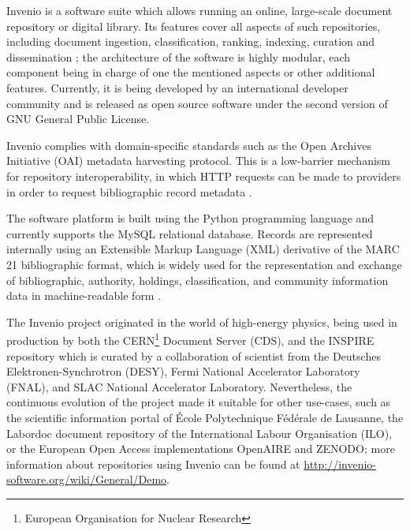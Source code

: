 
Invenio \cite{ref:invenio} is a software suite which allows running an online,
large-scale document repository or digital library. Its features cover all
aspects of such repositories, including document ingestion, classification,
ranking, indexing, curation and dissemination \cite{ref:kaplun, ref:glauner};
the architecture of the software is highly modular, each component being in
charge of one the mentioned aspects or other additional features. Currently, it
is being developed by an international developer community and is released as
open source software under the second version of GNU General Public License.

Invenio complies with domain-specific standards such as the Open Archives
Initiative (OAI) metadata harvesting protocol. This is a low-barrier mechanism for
repository interoperability, in which HTTP requests can be made to providers in
order to request bibliographic record metadata \cite{ref:oai}.

The software platform is built using the Python programming language and
currently supports the MySQL relational database. Records are represented
internally using an Extensible Markup Language (XML) derivative of the MARC 21
bibliographic format, which is widely used for the representation and exchange
of bibliographic, authority, holdings, classification, and community
information data in machine-readable form \cite{ref:marc}.

The Invenio project originated in the world of high-energy physics, being used
in production by both the CERN\footnote{European Organisation for Nuclear
Research} Document Server (CDS), and the INSPIRE repository which is curated
by a collaboration of scientist from the Deutsches Elektronen-Synchrotron
(DESY), Fermi National Accelerator Laboratory (FNAL), and SLAC National
Accelerator Laboratory. Nevertheless, the continuous evolution of the project
made it suitable for other use-cases, such as the scientific information portal
of \'{E}cole Polytechnique F\'{e}d\'{e}rale de Lausanne, the Labordoc document
repository of the International Labour Organisation (ILO), or the European Open
Access implementations OpenAIRE and ZENODO; more information about repositories
using Invenio can be found at
\url{http://invenio-software.org/wiki/General/Demo}.
